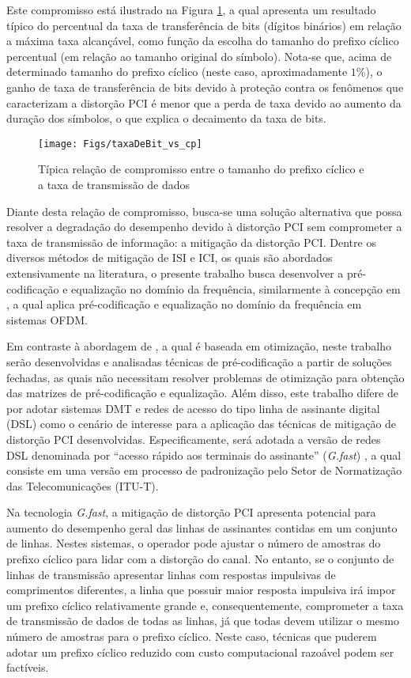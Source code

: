 Este compromisso está ilustrado na Figura \ref{fig:tradeoff_cp_bitrate}, a qual apresenta um resultado típico do percentual da taxa de transferência de bits (dígitos binários) em relação a máxima taxa alcançável, como função da escolha do tamanho do prefixo cíclico percentual (em relação ao tamanho original do símbolo). Nota-se que, acima de determinado tamanho do prefixo cíclico (neste caso, aproximadamente $1\%$), o ganho de taxa de transferência de bits devido à proteção contra os fenômenos que caracterizam a distorção PCI é menor que a perda de taxa devido ao aumento da duração dos símbolos, o que explica o decaimento da taxa de bits.

\begin{figure}[h]
\centering
\texttt{[image: Figs/taxaDeBit\_vs\_cp]}
\caption{ Típica relação de compromisso entre o tamanho do prefixo cíclico e a taxa de transmissão de dados  \label{fig:tradeoff_cp_bitrate}}
\end{figure}
Diante desta relação de compromisso, busca-se uma solução alternativa que possa resolver a degradação do desempenho devido à distorção PCI sem comprometer a taxa de transmissão de informação: a mitigação da distorção PCI. Dentre os diversos métodos de mitigação de ISI e ICI, os quais são abordados extensivamente na literatura, o presente trabalho busca desenvolver a pré-codificação e equalização no domínio da frequência, similarmente à concepção em \cite{Malkin08}, a qual aplica pré-codificação e equalização no domínio da frequência em sistemas OFDM.

Em contraste à abordagem de \cite{Malkin08}, a qual é baseada em otimização, neste trabalho serão desenvolvidas e analisadas técnicas de pré-codificação a partir de soluções fechadas, as quais não necessitam resolver problemas de otimização para obtenção das matrizes de pré-codificação e equalização. Além disso, este trabalho difere de \cite{Malkin08} por adotar sistemas DMT e redes de acesso do tipo linha de assinante digital (DSL) como o cenário de interesse para a aplicação das técnicas de mitigação de distorção PCI desenvolvidas. Especificamente, será adotada a versão de redes DSL denominada por ``acesso rápido aos terminais do assinante'' (\emph{G.fast}) \cite{maes2012}, a qual consiste em uma versão em processo de padronização pelo Setor de Normatização das Telecomunicações (ITU-T).

Na tecnologia \emph{G.fast}, a mitigação de distorção PCI apresenta potencial para aumento do desempenho geral das linhas de assinantes contidas em um conjunto de linhas. Nestes sistemas, o operador pode ajustar o número de amostras do prefixo cíclico para lidar com a distorção do canal. No entanto, se o conjunto de linhas de transmissão apresentar linhas com respostas impulsivas de comprimentos diferentes, a linha que possuir maior resposta impulsiva irá impor um prefixo cíclico relativamente grande e, consequentemente, comprometer a taxa de transmissão de dados de todas as linhas, já que todas devem utilizar o mesmo número de amostras para o prefixo cíclico. Neste caso, técnicas que puderem adotar um prefixo cíclico reduzido com custo computacional razoável podem ser factíveis.

